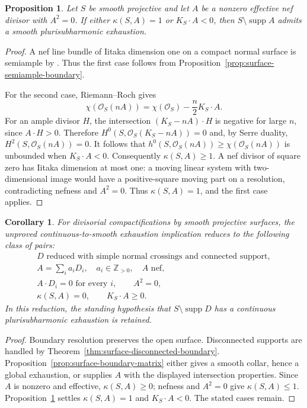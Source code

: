 \documentclass[11pt]{amsart}
\newtheorem{proposition}[theorem]{Proposition}
\newtheorem{corollary}[theorem]{Corollary}
\theoremstyle{definition}
\theoremstyle{remark}
\numberwithin{equation}{section}
\newcommand{\OO}{\mathcal O}
\newcommand{\supp}{\operatorname{supp}}
\begin{document}
\begin{proposition}\label{prop:surface-moving-boundary}
Let $S$ be smooth projective and let $A$ be a nonzero effective nef
divisor with $A^2=0$.  If either $\kappa(S,A)=1$ or $K_S\cdot A<0$,
then $S\setminus\supp A$ admits a smooth plurisubharmonic exhaustion.
\end{proposition}
\begin{proof}
A nef line bundle of Iitaka dimension one on a compact normal surface
is semiample by \cite[Lemma~7.3]{Fujino2021}.  Thus the first case
follows from Proposition~\ref{prop:surface-semiample-boundary}.

For the second case, Riemann--Roch gives
\[
 \chi(\OO_S(nA))=\chi(\OO_S)-\frac n2K_S\cdot A.
\]
For an ample divisor $H$, the intersection
$(K_S-nA)\cdot H$ is negative for large $n$, since $A\cdot H>0$.
Therefore $H^0(S,\OO_S(K_S-nA))=0$ and, by Serre duality,
$H^2(S,\OO_S(nA))=0$.  It follows that
$h^0(S,\OO_S(nA))\ge\chi(\OO_S(nA))$ is unbounded when $K_S\cdot A<0$.
Consequently $\kappa(S,A)\ge1$.  A nef divisor of square zero has
Iitaka dimension at most one: a moving linear system with
two-dimensional image would have a positive-square moving part on a
resolution, contradicting nefness and $A^2=0$.  Thus
$\kappa(S,A)=1$, and the first case applies.
\end{proof}

\begin{corollary}\label{cor:surface-connected-residual}
For divisorial compactifications by smooth projective surfaces, the
unproved continuous-to-smooth exhaustion implication reduces to the
following class of pairs:
\[
 \begin{gathered}
 D\text{ reduced with simple normal crossings and connected support},
 \\[2pt]
 A=\sum_i a_iD_i,\quad a_i\in\mathbb Z_{>0},\quad A\text{ nef},
 \\[2pt]
 A\cdot D_i=0\text{ for every }i,\qquad A^2=0,
 \\[2pt]
 \kappa(S,A)=0,\qquad K_S\cdot A\ge0.
 \end{gathered}
\]
In this reduction, the standing hypothesis that
$S\setminus\supp D$ has a continuous plurisubharmonic exhaustion is
retained.
\end{corollary}
\begin{proof}
Boundary resolution preserves the open surface.  Disconnected supports
are handled by Theorem~\ref{thm:surface-disconnected-boundary}.
Proposition~\ref{prop:surface-boundary-matrix} either gives a smooth
collar, hence a global exhaustion, or supplies $A$ with the displayed
intersection properties.  Since $A$ is nonzero and effective,
$\kappa(S,A)\ge0$; nefness and $A^2=0$ give $\kappa(S,A)\le1$.
Proposition~\ref{prop:surface-moving-boundary} settles
$\kappa(S,A)=1$ and $K_S\cdot A<0$.  The stated cases remain.
\end{proof}
\end{document}
